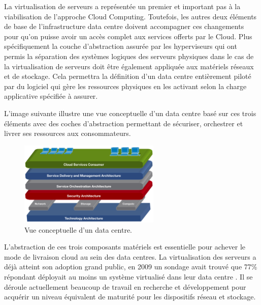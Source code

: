 La virtualisation de serveurs a représentée un premier et important pas à la viabilisation de l'approche Cloud Computing. Toutefois, les autres deux éléments de base de l'infrastructure data centre doivent accompagner ces changements pour qu'on puisse avoir un accès complet aux services offerts par le Cloud. Plus spécifiquement la couche d'abstraction assurée par les hyperviseurs qui ont permis la séparation des systèmes logiques des serveurs physiques dans le cas de la virtualisation de serveurs doit être également appliquée aux matériels réseaux et de stockage. Cela permettra la définition d'un data centre entièrement piloté par du logiciel qui gère les ressources physiques en les activant selon la charge applicative spécifiée à assurer.

\pagebreak

 L'image suivante illustre une vue conceptuelle d'un data centre basé sur ces trois éléments avec des coches d'abstraction permettant de sécuriser, orchestrer et livrer ses ressources aux consommateurs.

\begin{figure}[h]
\begin{center}

\includegraphics[width=0.6\textwidth]{images/CloudRefArchi} 
\caption{Vue conceptuelle d'un data centre. \cite{ciscoCCDCStrategyArchiSolutions}} \label{cloud_conceptual_view}

\end{center}
\end{figure}

L'abstraction de ces trois composants matériels est essentielle pour achever le mode de livraison cloud au sein des data centres. La virtualisation des serveurs a déjà atteint son adoption grand public, en 2009 un sondage avait trouvé que 77\% répondant déployait au moins un système virtualisé dans leur data centre \cite{x86ServersVirtualization}. Il se déroule actuellement beaucoup de travail en recherche et développement pour acquérir un niveau équivalent de maturité pour les dispositifs réseau et stockage. 

